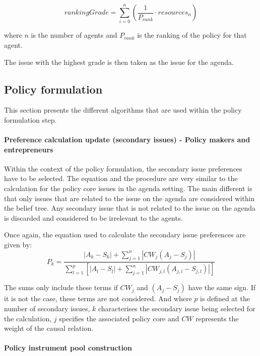 \begin{equation}
rankingGrade = \sum_{i=0}^n \left( \frac{1}{P_{rank}} \cdot resources_n \right)
\end{equation}

where $n$ is the number of agents and $P_{rank}$ is the ranking of the policy for that agent.

The issue with the highest grade is then taken as the issue for the agenda.


\subsection{Policy formulation}

This section presents the different algorithms that are used within the policy formulation step.


\paragraph{Preference calculation update (secondary issues) - Policy makers and entrepreneurs}

Within the context of the policy formulation, the secondary issue preferences have to be selected. The equation and the procedure are very similar to the calculation for the policy core issues in the agenda setting. The main different is that only issues that are related to the issue on the agenda are considered within the belief tree. Any secondary issue that is not related to the issue on the agenda is discarded and considered to be irrelevant to the agents.

Once again, the equation used to calculate the secondary issue preferences are given by: 
\begin{equation}
P_k= \frac{ |A_k - S_k| + \sum_{j=1}^n |CW_j \left( A_j - S_j \right)|}{\sum_{l=1}^p \left[ |A_l - S_l| + \sum_{j=1}^n \left|CW_{j,l} \left( A_{j,l} - S_{j,l} \right) \right| \right]}
\end{equation}

The sums only include these terms if $CW_j$ and $\left( A_j - S_j \right)$ have the same sign. If it is not the case, these terms are not considered. And where $p$ is defined at the number of secondary issues, $k$ characterises the secondary issue being selected for the calculation, $j$ specifies the associated policy core and $CW$ represents the weight of the causal relation.

\paragraph{Policy instrument pool construction}

